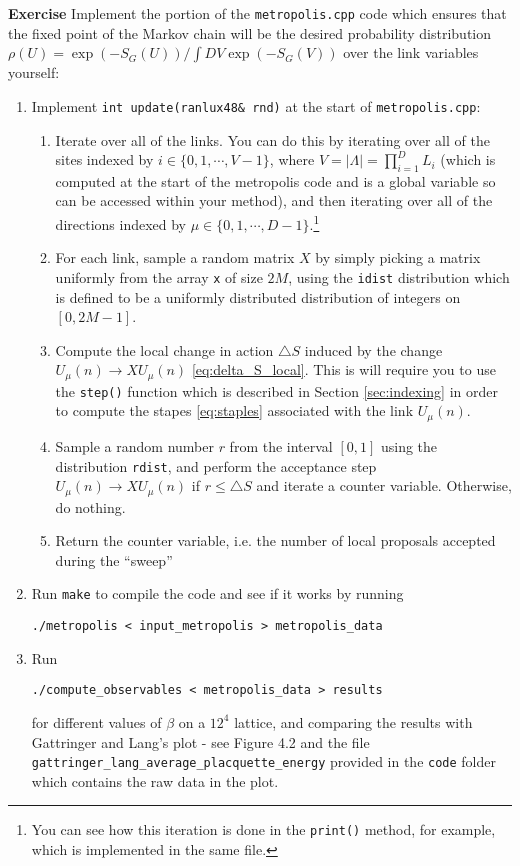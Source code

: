 \documentclass[11pt]{article}
\newcounter{exerciseno}
\DeclareRobustCommand{\exCnt}{\refstepcounter{exerciseno}\theexerciseno}
\begin{document}
\begin{tcolorbox}\textbf{Exercise \exCnt} Implement the portion of the \lstinline{metropolis.cpp} code which ensures that the fixed point of the Markov chain will be the desired probability distribution $\rho(U)=\exp(-S_G(U))/\int DV \exp(-S_G(V))$ over the link variables yourself:
\begin{enumerate}
\item Implement \lstinline{int update(ranlux48& rnd)} at the start of \lstinline{metropolis.cpp}:
	\begin{enumerate}
	\item Iterate over all of the links. You can do this by iterating over all of the sites indexed by $i\in\{0,1,\cdots,V-1\}$, where $V=|\Lambda|=\prod_{i=1}^D L_i$ (which is computed at the start of the metropolis code and is a global variable so can be accessed within your method), and then iterating over all of the directions indexed by $\mu\in\{0,1,\cdots,D-1\}$.\footnote{You can see how this iteration is done in the \lstinline{print()} method, for example, which is implemented in the same file.} 
	\item For each link, sample a random matrix $X$ by simply picking a matrix uniformly from the array \lstinline{x} of size $2M$, using the \lstinline{idist} distribution which is defined to be a uniformly distributed distribution of integers on $[0,2M-1]$.
	\item Compute the local change in action $\triangle S$ induced by the change $U_\mu(n)\to XU_\mu(n)$ \eqref{eq:delta_S_local}. This is will require you to use the \lstinline{step()} function which is described in Section \ref{sec:indexing} in order to compute the stapes \eqref{eq:staples} associated with the link $U_\mu(n)$.
	\item Sample a random number $r$ from the interval $[0,1]$ using the distribution \lstinline{rdist}, and perform the acceptance step $U_\mu(n)\to XU_\mu(n)$ if $r\leq \triangle S$ and iterate a counter variable. Otherwise, do nothing.
	\item Return the counter variable, i.e. the number of local proposals accepted during the ``sweep''
	\end{enumerate}
\item Run \lstinline{make} to compile the code and see if it works by running\begin{center}\lstinline{./metropolis < input_metropolis > metropolis_data}\end{center}
\item Run \begin{center}\lstinline{./compute_observables < metropolis_data > results}\end{center} for different values of $\beta$ on a $12^4$ lattice, and comparing the results with Gattringer and Lang's plot \cite{gattringer_lang_2009} - see Figure 4.2 and the file \lstinline{gattringer_lang_average_placquette_energy} provided in the \lstinline{code} folder which contains the raw data in the plot.

\end{enumerate}
\end{tcolorbox}
\end{document}
